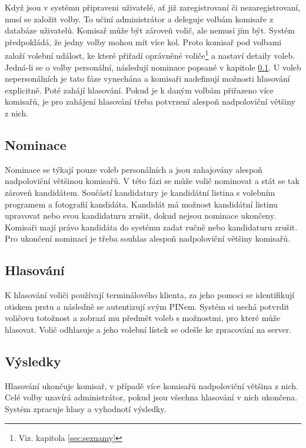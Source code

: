 \documentclass[11pt,twoside,a4paper]{book}
\begin{document}
Když jsou v systému připraveni uživatelé, ať již zaregistrovaní či nezaregistrovaní, musí se založit volby. To učiní administrátor a deleguje volbám komisaře z databáze uživatelů. Komisař může být zároveň volič, ale nemusí jím být. Systém předpokládá, že jedny volby mohou mít více kol. Proto komisař pod volbami založí volební událost, ke které přiřadí oprávněné voliče\footnote{Viz. kapitola \ref{sec:seznamy}} a nastaví detaily voleb. Jedná-li se o volby personální, následují nominace popsané v kapitole \ref{sec:nominace}. U voleb nepersonálních je tato fáze vynechána a komisaři nadefinují možnosti hlasování explicitně. Poté zahájí hlasování. Pokud je k daným volbám přiřazeno více komisařů, je pro zahájení hlasování třeba potvrzení alespoň nadpoloviční většiny z nich.

\subsection{Nominace} \label{sec:nominace}

Nominace se týkají pouze voleb personálních a jsou zahajovány alespoň nadpoloviční většinou komisařů. V této fázi se může volič nominovat a stát se tak zároveň kandidátem. Součástí kandidatury je kandidátní listina s volebním programem a fotografií kandidáta. Kandidát má možnost kandidátní listinu upravovat nebo svou kandidaturu zrušit, dokud nejsou nominace ukončeny. Komisaři mají právo kandidáta do systému zadat ručně nebo kandidaturu zrušit. Pro ukončení nominací je třeba souhlas alespoň nadpoloviční většiny komisařů. 

\subsection{Hlasování}

K hlasování voliči používají terminálového klienta, za jeho pomoci se identifikují otiskem prstu a následně se autentizují svým PINem. Systém si nechá potvrdit voličovu totožnost a zobrazí mu předmět voleb s možnostmi, pro které může hlasovat. Volič odhlasuje a jeho volební lístek se odešle ke zpracování na server. 

\subsection{Výsledky}

Hlasování ukončuje komisař, v případě více komisařů nadpoloviční většina z nich. Celé volby uzavírá administrátor, pokud jsou všechna hlasování v nich ukončena. Systém zpracuje hlasy a vyhodnotí výsledky.
\end{document}

